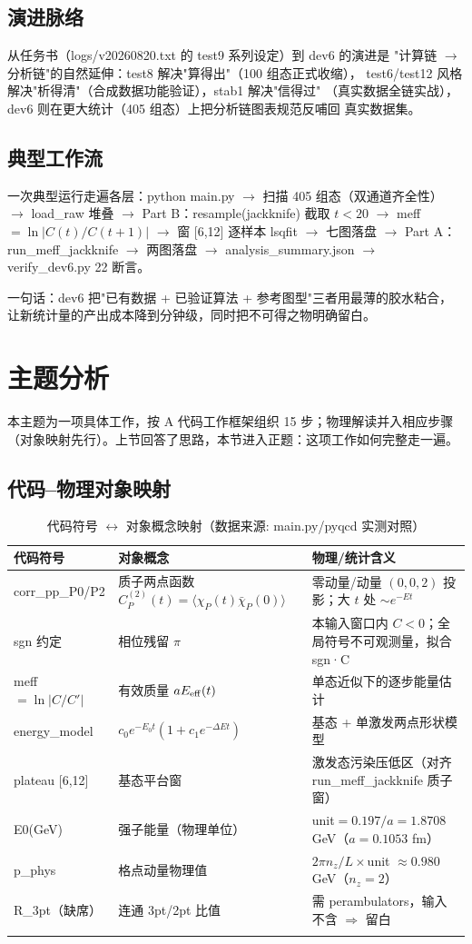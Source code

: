 \documentclass[UTF8]{ctexart}
\begin{document}
\subsection{演进脉络}
从任务书（logs/v20260820.txt 的 test9 系列设定）到 dev6 的演进是
"计算链 $\rightarrow$ 分析链"的自然延伸：test8 解决"算得出"（100 组态正式收缩），
test6/test12 风格解决"析得清"（合成数据功能验证），stab1 解决"信得过"
（真实数据全链实战），dev6 则在更大统计（405 组态）上把分析链图表规范反哺回
真实数据集。
\subsection{典型工作流}
一次典型运行走遍各层：python main.py $\rightarrow$ 扫描 405 组态（双通道齐全性）
$\rightarrow$ load\_raw 堆叠 $\rightarrow$ Part B：resample(jackknife) 截取 $t<20$
$\rightarrow$ meff $=\ln|C(t)/C(t{+}1)|$ $\rightarrow$ 窗 [6,12] 逐样本 lsqfit
$\rightarrow$ 七图落盘 $\rightarrow$ Part A：run\_meff\_jackknife $\rightarrow$ 两图落盘
$\rightarrow$ analysis\_summary.json $\rightarrow$ verify\_dev6.py 22 断言。
\begin{ideabox}
一句话：dev6 把"已有数据 + 已验证算法 + 参考图型"三者用最薄的胶水粘合，
让新统计量的产出成本降到分钟级，同时把不可得之物明确留白。
\end{ideabox}

\section{主题分析}
本主题为一项具体工作，按 A 代码工作框架组织 15 步；物理解读并入相应步骤
（对象映射先行）。上节回答了思路，本节进入正题：这项工作如何完整走一遍。

\subsection{代码--物理对象映射}
\begin{xltabular}{\textwidth}{lXX}
\toprule
代码符号 & 对象概念 & 物理/统计含义 \\
\midrule
\endhead
corr\_pp\_P0/P2 & 质子两点函数 $C^{(2)}_P(t)=\langle\chi_P(t)\bar\chi_P(0)\rangle$ &
零动量/动量 $(0,0,2)$ 投影；大 $t$ 处 $\sim e^{-Et}$ \\
sgn 约定 & 相位残留 $\pi$ & 本输入窗口内 $C<0$；全局符号不可观测量，拟合 sgn·C \\
meff$=\ln|C/C'|$ & 有效质量 $aE_{\rm eff}(t)$ & 单态近似下的逐步能量估计 \\
energy\_model & $c_0e^{-E_0t}(1+c_1e^{-\Delta Et})$ & 基态 + 单激发两点形状模型 \\
plateau [6,12] & 基态平台窗 & 激发态污染压低区（对齐 run\_meff\_jackknife 质子窗）\\
E0(GeV) & 强子能量（物理单位）& unit$=0.197/a=1.8708$ GeV（$a=0.1053$ fm）\\
p\_phys & 格点动量物理值 & $2\pi n_z/L\times$unit $\approx0.980$ GeV（$n_z{=}2$）\\
R\_3pt（缺席）& 连通 3pt/2pt 比值 & 需 perambulators，输入不含 $\Rightarrow$ 留白 \\
\bottomrule
\caption{代码符号 $\leftrightarrow$ 对象概念映射（数据来源: main.py/pyqcd 实测对照）}
\end{xltabular}
\end{document}
